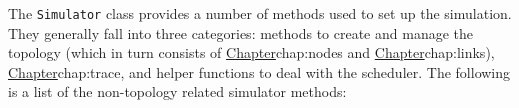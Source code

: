 The {\tt Simulator} class provides a number of methods used
to set up the simulation.
They generally fall into three categories:
methods to create and manage the topology 
(which in turn consists of
\href{managing the nodes}{Chapter}{chap:nodes} and
\href{managing t                                                                                                                                                                                                                                               






                                                                                                                                                                                                                                                               






                                                                                                                                                                                                                                                               






              he links}{Chapter}{chap:links}),
\href{methods to perform tracing}{Chapter}{chap:trace},
and helper functions to deal with the scheduler.
The following is a list of the non-topology related simulator methods:
